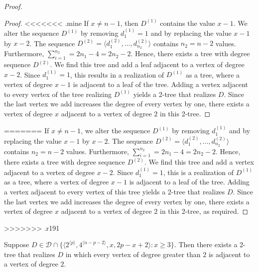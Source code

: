 \documentclass[lotsofwhite,charterfonts]{patmorin}
\newcommand{\rep}[1]{^{\langle#1\rangle}}
\begin{document}
\begin{proof}
\begin{proof}
<<<<<<< .mine
If $x \neq n-1$, then $D^{(1)}$ contains the value $x-1$.  We alter
the sequence $D^{(1)}$ by removing $d_1^{(1)}=1$ and by replacing the
value $x-1$ by $x-2$. The sequence $D^{(2)} = \langle
d_1^{(2)},\ldots,d_{n_2}^{(2)}\rangle$ contains $n_2 = n-2$ values.
Furthermore, $\sum_{i=1}^{n_2} = 2n_1 - 4 = 2n_2 - 2$. Hence, there
exists a tree with degree sequence $D^{(2)}$. We find this tree and
add a leaf adjacent to a vertex of degree $x-2$. Since $d_1^{(1)} =
1$, this results in a realization of $D^{(1)}$ as a tree, where a vertex of
degree $x-1$ is adjacent to a leaf of the tree. Adding a vertex
adjacent to every vertex of the tree realizing $D^{(1)}$ yields a
2-tree that realizes $D$. Since the last vertex we add increases the
degree of every vertex by one, there exists a vertex of degree $x$
adjacent to a vertex of degree $2$ in this 2-tree.  \end{proof}
=======
If $x \neq n-1$, we alter the sequence $D^{(1)}$ by removing
$d_1^{(1)}$ and by replacing the value $x-1$ by $x-2$. The sequence
$D^{(2)} = \langle d_1^{(2)},\ldots,d_{n_2}^{(2)}\rangle$ contains
$n_2 = n-2$ values. Furthermore, $\sum_{i=1}^{n_2} = 2n_1 - 4 = 2n_2 -
2$. Hence, there exists a tree with degree sequence $D^{(2)}$. We find
this tree and add a vertex adjacent to a vertex of degree $x-2$. Since
$d_1^{(1)} = 1$, this is a realization of $D^{(1)}$ as a tree, where a
vertex of degree $x-1$ is adjacent to a leaf of the tree. Adding a
vertex adjacent to every vertex of this tree yields a 2-tree that
realizes $D$. Since the last vertex we add increases the degree of
every vertex by one, there exists a vertex of degree $x$ adjacent to a
vertex of degree $2$ in this 2-tree, as required.
\end{proof}
>>>>>>> .r191

\begin{lem}
Suppose $D\in \mathcal{D}\cap \{\langle
2\rep{p},4\rep{n-p-2},x,2p-x+2\rangle:x\ge 3\}$.  Then there exists a 2-tree
that realizes $D$ in which every vertex of degree greater than $2$ is
adjacent to a vertex of degree 2.
\end{lem}
\end{document}
